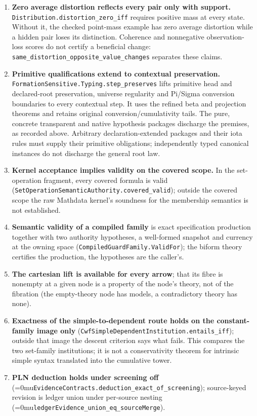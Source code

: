 \documentclass[11pt]{article}
\newcommand{\leanname}[1]{\textup{\Urlmuskip=0mu\relax\nolinkurl{#1}}}
\theoremstyle{definition}
\theoremstyle{remark}
\begin{document}
\begin{enumerate}
\item \textbf{Zero average distortion reflects every pair only with support.}
  \nolinkurl{Distribution.distortion_zero_iff} requires positive mass at
  every state. Without it, the checked point-mass example has zero average
  distortion while a hidden pair loses its distinction. Coherence and
  nonnegative observation-loss scores do not certify a beneficial change:
  \nolinkurl{same_distortion_opposite_value_changes} separates these claims.
\item \textbf{Primitive qualifications extend to contextual preservation.}
  \nolinkurl{FormationSensitive.Typing.step_preserves} lifts primitive head
  and declared-root preservation, universe regularity and Pi/Sigma
  conversion boundaries to every contextual step. It uses the refined beta
  and projection theorems and retains original conversion/cumulativity
  tails. The pure, concrete transparent and native hypothesis packages discharge the premises,
  as recorded above. Arbitrary declaration-extended packages and their iota
  rules must supply their primitive obligations; independently typed
  canonical instances do not discharge the general root law.
\item \textbf{Kernel acceptance implies validity on the covered scope.}  In
  the set-operation fragment, every covered formula is valid
  (\nolinkurl{SetOperationSemanticAuthority.covered_valid}); outside the
  covered scope the raw Mathdata kernel's soundness for the membership
  semantics is not established.
\item \textbf{Semantic validity of a compiled family} is exact specification
  production together with two authority hypotheses, a well-formed snapshot
  and currency at the owning space
  (\nolinkurl{CompiledGuardFamily.ValidFor}); the biform theory certifies the
  production, the hypotheses are the caller's.
\item \textbf{The cartesian lift is available for every arrow}; that its
  fibre is nonempty at a given node is a property of the node's theory, not
  of the fibration (the empty-theory node has models, a contradictory theory
  has none).
\item \textbf{Exactness of the simple-to-dependent route holds on the
  constant-family image only} (\nolinkurl{CwfSimpleDependentInstitution.entails_iff});
  outside that image the descent criterion says what fails. This compares
  the two set-family institutions; it is not a conservativity theorem for
  intrinsic simple syntax translated into the cumulative tower.
\item \textbf{PLN deduction holds under screening off}
  (\leanname{EvidenceContracts.deduction_exact_of_screening}); source-keyed
  revision is ledger union under per-source nesting
  (\leanname{ledgerEvidence_union_eq_sourceMerge}).
\end{enumerate}
\end{document}
